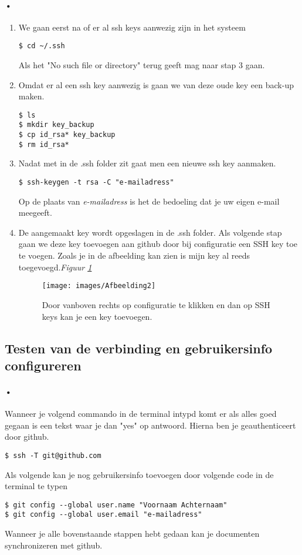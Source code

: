 \documentclass[12pt,a4paper]{report}
\begin{document}
\paragraph{•}
\begin{enumerate}
    \item 
We gaan eerst na of er al ssh keys aanwezig zijn in het systeem 
\begin{lstlisting}[frame=BTrl]
$ cd ~/.ssh
\end{lstlisting}
Als het "No such file or directory" terug geeft mag naar stap 3 gaan.
    \item 
Omdat er al een ssh key aanwezig is gaan we van deze oude key een back-up maken.
\begin{lstlisting}[frame=BTrl]
$ ls
$ mkdir key_backup
$ cp id_rsa* key_backup
$ rm id_rsa*
\end{lstlisting}
    \item 
Nadat met in de .ssh folder zit gaat men een nieuwe ssh key aanmaken.
\begin{lstlisting}[frame=BTrl]
$ ssh-keygen -t rsa -C "e-mailadress"
\end{lstlisting}
Op de plaats van \emph{e-mailadress} is het de bedoeling dat je uw eigen e-mail meegeeft.
	\item
De aangemaakt key wordt opgeslagen in de .ssh folder. Als volgende stap gaan we deze key toevoegen aan github door bij configuratie een SSH key toe te voegen. Zoals je in de afbeelding kan zien is mijn key al reeds toegevoegd.\emph{Figuur \ref{afbeelding2}}
\begin{figure} [h]
\texttt{[image: images/Afbeelding2]}
\caption[Toevoegen Key]{Door vanboven rechts op configuratie te klikken en dan op SSH keys kan je een key toevoegen.}
\label{afbeelding2}
\end{figure}
\end{enumerate}

\subsection{Testen van de verbinding en gebruikersinfo configureren}
\paragraph{•}
Wanneer je volgend commando in de terminal intypd komt er als alles goed gegaan is een tekst waar je dan "yes" op antwoord. Hierna ben je geauthenticeert door github.
\begin{lstlisting}[frame=BTrl]
$ ssh -T git@github.com
\end{lstlisting}
Als volgende kan je nog gebruikersinfo toevoegen door volgende code in de terminal te typen
\begin{lstlisting}[frame=BTrl]
$ git config --global user.name "Voornaam Achternaam"
$ git config --global user.email "e-mailadress"
\end{lstlisting}
Wanneer je alle bovenstaande stappen hebt gedaan kan je documenten synchronizeren met github.
\end{document}
